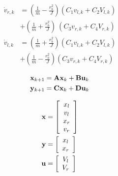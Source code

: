 \begin{align*}
  \dot{v}_{r,k} &= \left(\frac{1}{m} - \frac{r_b^2}{J}\right)
    \left(C_1 v_{l,k} + C_2 V_{l,k}\right) \nonumber \\
  & + \left(\frac{1}{m} + \frac{r_b^2}{J}\right)\
    \left(C_3 v_{r,k} + C_4 V_{r,k}\right) \\
  \dot{v}_{l,k} &= \left(\frac{1}{m} + \frac{r_b^2}{J}\right)
    \left(C_1 v_{l,k} + C_2 V_{l,k}\right) \nonumber \\
  & + \left(\frac{1}{m} - \frac{r_b^2}{J}\right)
    \left(C_3 v_{r,k} + C_4 V_{r,k}\right)
\end{align*}

\begin{align*}
  \mathbf{x}_{k+1} &= \mathbf{A} \mathbf{x}_k + \mathbf{B} \mathbf{u}_k \\
  \mathbf{y}_{k+1} &= \mathbf{C} \mathbf{x}_k + \mathbf{D} \mathbf{u}_k
\end{align*}

\begin{align*}
  \mathbf{x} &= \left[
  \begin{array}{c}
    x_l \\
    v_l \\
    x_r \\
    v_r
  \end{array}
  \right] \\
  \mathbf{y} &= \left[
  \begin{array}{c}
    x_l \\
    x_r
  \end{array}
  \right] \\
  \mathbf{u} &= \left[
  \begin{array}{c}
    V_l \\
    V_r
  \end{array}
  \right]
\end{align*}

